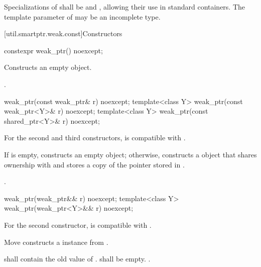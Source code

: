 \pnum
Specializations of  shall be  and
, allowing their use in standard
containers.  The template parameter  of  may be an
incomplete type.

[util.smartptr.weak.const]{Constructors}

%
\begin{itemdecl}
constexpr weak_ptr() noexcept;
\end{itemdecl}

\begin{itemdescr}
\pnum
\effects
Constructs an empty  object.

\pnum
\ensures
{}.
\end{itemdescr}

%
\begin{itemdecl}
weak_ptr(const weak_ptr& r) noexcept;
template<class Y> weak_ptr(const weak_ptr<Y>& r) noexcept;
template<class Y> weak_ptr(const shared_ptr<Y>& r) noexcept;
\end{itemdecl}

\begin{itemdescr}
\pnum
\constraints
For the second and third constructors,  is compatible with .

\pnum
\effects
If  is empty, constructs
an empty  object; otherwise, constructs
a  object that shares ownership
with  and stores a copy of the pointer stored in .

\pnum
\ensures
{}.
\end{itemdescr}

%
\begin{itemdecl}
weak_ptr(weak_ptr&& r) noexcept;
template<class Y> weak_ptr(weak_ptr<Y>&& r) noexcept;
\end{itemdecl}

\begin{itemdescr}
\pnum
\constraints
For the second constructor,  is compatible with .

\pnum
\effects
Move constructs a  instance from .

\pnum
\ensures
{} shall contain the old value of .
 shall be empty. .
\end{itemdescr}

